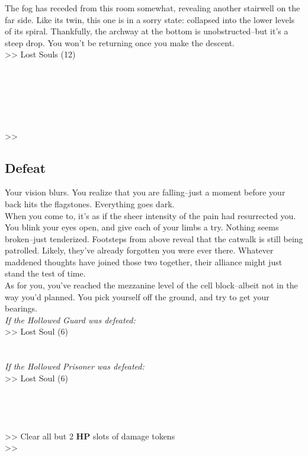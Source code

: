 The fog has receded from this room somewhat, revealing another stairwell on the far side. Like its twin, this one is in a sorry state: collapsed into the lower levels of its spiral. Thankfully, the archway at the bottom is unobstructed--but it’s a steep drop. You won’t be returning once you make the descent.\\

>> Lost Souls (12)\\
\\
\\
\\
\\
\\
\\
>> 

\subsection*{Defeat}
Your vision blurs. You realize that you are falling--just a moment before your back hits the flagstones. Everything goes dark.\\

When you come to, it’s as if the sheer intensity of the pain had resurrected you. You blink your eyes open, and give each of your limbs a try. Nothing seems broken--just tenderized. Footsteps from above reveal that the catwalk is still being patrolled. Likely, they’ve already forgotten you were ever there. Whatever maddened thoughts have joined those two together, their alliance might just stand the test of time.\\

As for you, you’ve reached the mezzanine level of the cell block--albeit not in the way you’d planned. You pick yourself off the ground, and try to get your bearings.\\

\emph{If the Hollowed Guard was defeated:}\\
>> Lost Soul (6)\\
\\
\\

\emph{If the Hollowed Prisoner was defeated:}\\
>> Lost Soul (6)\\
\\
\\
\\
\\

>> Clear all but 2 \textbf{HP} slots of damage tokens\\
>> 